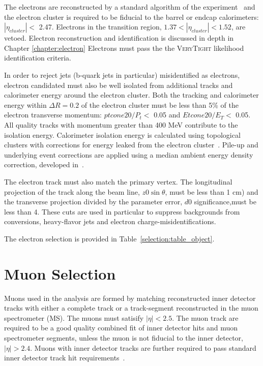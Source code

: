The electrons are reconstructed by a standard algorithm of the
experiment~\cite{EgammaSF} and the electron cluster is required to be fiducial 
to the barrel or endcap calorimeters: $|\eta_{cluster}| < $ 2.47. Electrons
in the transition region, $1.37 < |\eta_{cluster}| < 1.52$, are vetoed.
Electron reconstruction and identification is discussed in depth in Chapter \ref{chapter:electron}
Electrons must pass the the \textsc{VeryTight} likelihood identification criteria.

In order to reject jets (b-quark jets in particular) misidentified as electrons,
electron candidated  must also be well isolated from additional tracks and
calorimeter energy around the electron cluster. Both the tracking 
and calorimeter energy within $\Delta R=0.2$ of the electron
cluster must be less than 5\% of the electron transverse momentum: $ptcone20/P_t <$ 0.05 and $Etcone20/E_T <$ 0.05.
All quality tracks with momentum greater than 400 MeV contribute to the isolation
energy.  Calorimeter isolation energy is calculated
using topological clusters with corrections for energy leaked from the
electron cluster~\cite{Topo}. Pile-up and underlying event corrections are applied using
a median ambient energy density correction, developed in~\cite{PileupCorrections}. 

The electron track must also match the primary vertex. The longitudinal projection 
of the track along the beam line, $z0\sin{\theta}$, must be less than 1 cm) and the transverse projection divided by the
parameter error, $d0$ significance,must be less than 4. These cuts are used in particular to suppress backgrounds
from conversions, heavy-flavor jets and electron charge-misidentifications. 


The electron selection is provided in Table~\ref{selection:table_object}. 


\section{Muon Selection}

Muons used in the analysis are formed by matching reconstructed inner detector
tracks with either a complete track or a track-segment reconstructed in the muon spectrometer (MS).
The muons must satisify $|\eta| < 2.5$.
The muon track are required to be a good quality combined fit of inner detector hits and muon
spectrometer segments, unless the muon is not fiducial to the
inner detector, $|\eta| > 2.4$.  Muons with inner detector tracks are further required
to pass standard inner detector track hit requirements~\cite{MCP2012}.  

